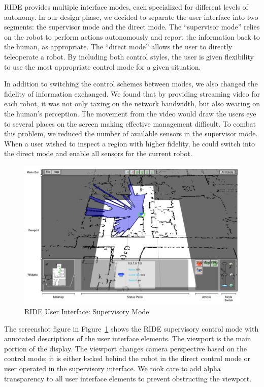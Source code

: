 RIDE provides multiple interface modes, each specialized for different levels of autonomy. In our design phase, we decided to separate the user interface into two segments: the supervisor mode and the direct mode. The ``supervisor mode'' relies on the robot to perform actions autonomously and report the information back to the human, as appropriate. The ``direct mode'' allows the user to directly teleoperate a robot. By including both control styles, the user is given flexibility to use the most appropriate control mode for a given situation.

In addition to switching the control schemes between modes, we also changed the fidelity of information exchanged. We found that by providing streaming video for each robot, it was not only taxing on the network bandwidth, but also wearing on the human's perception. The movement from the video would draw the users eye to several places on the screen making effective management difficult. To combat this problem, we reduced the number of available sensors in the supervisor mode. When a user wished to inspect a region with higher fidelity, he could switch into the direct mode and enable all sensors for the current robot.

\begin{figure}[ht]
\begin{center}
\includegraphics[width=6.10in]{images/ride-ui.pdf}
\caption{RIDE User Interface: Supervisory Mode\label{fig:ride-ui}}
\end{center}
\end{figure}

The screenshot figure in Figure~\ref{fig:ride-ui} shows the RIDE supervisory control mode with annotated descriptions of the user interface elements. The viewport is the main portion of the display. The viewport changes camera perspective based on the control mode; it is either locked behind the robot in the direct control mode or user operated in the supervisory interface. We took care to add alpha transparency to all user interface elements to prevent obstructing the viewport.


